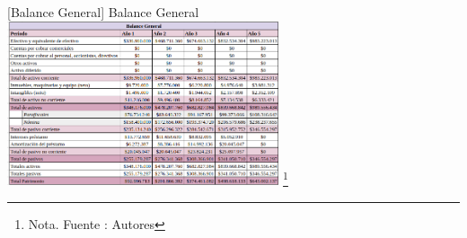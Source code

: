 \vspace{2mm}
\begin{minipage}{0.8\textwidth}
\centering
{}[{Balance General}]{ Balance General }
\label{balanceGeneral}
\includegraphics[width=0.6\textwidth]{Content/Images/AF/Balance_General.png}
\footnote{Nota. \textup{Fuente : Autores}}
\end{minipage}
\newpage